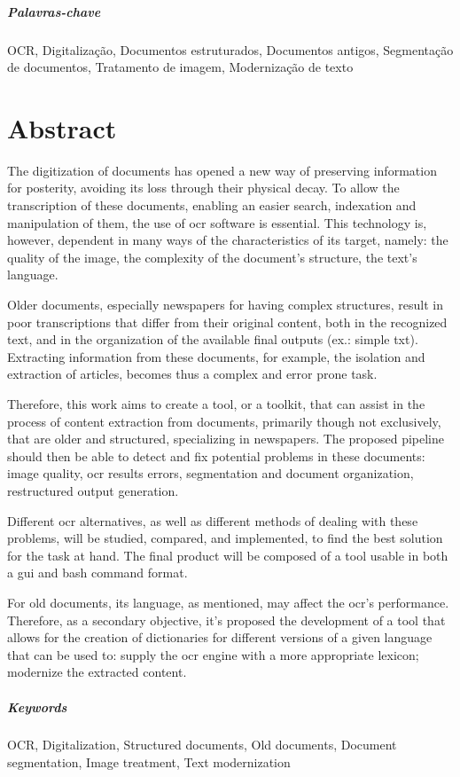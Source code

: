 \paragraph{Palavras-chave} OCR, Digitalização, Documentos estruturados, Documentos antigos, Segmentação de documentos, Tratamento de imagem, Modernização de texto

\cleardoublepage

\chapter*{Abstract}

The digitization of documents has opened a new way of preserving information for posterity, avoiding its loss through their physical decay. To allow the transcription of these documents, enabling an easier search, indexation and manipulation of them, the use of \acrshort{ocr} software is essential. This technology is, however, dependent in many ways of the characteristics of its target, namely: the quality of the image, the complexity of the document's structure, the text's language. 

Older documents, especially newspapers for having complex structures, result in poor transcriptions that differ from their original content, both in the recognized text, and in the organization of the available final outputs (ex.: simple txt).
Extracting information from these documents, for example, the isolation and extraction of articles, becomes thus a complex and error prone task. 

Therefore, this work aims to create a tool, or a toolkit, that can assist in the process of content extraction from documents, primarily though not exclusively, that are older and structured, specializing in newspapers. The proposed pipeline should then be able to detect and fix potential problems in these documents: image quality, \acrshort{ocr} results errors, segmentation and document organization, restructured output generation.

Different \acrshort{ocr} alternatives, as well as different methods of dealing with these problems, will be studied, compared, and implemented, to find the best solution for the task at hand. The final product will be composed of a tool usable in both a \acrshort{gui} and bash command format.

For old documents, its language, as mentioned, may affect the \acrshort{ocr}'s performance. Therefore, as a secondary objective, it’s proposed the development of a tool that allows for the creation of dictionaries for different versions of a given language that can be used to: supply the \acrshort{ocr} engine with a more appropriate lexicon; modernize the extracted content.


\paragraph{Keywords} OCR, Digitalization, Structured documents, Old documents, Document segmentation, Image treatment, Text modernization

\cleardoublepage
